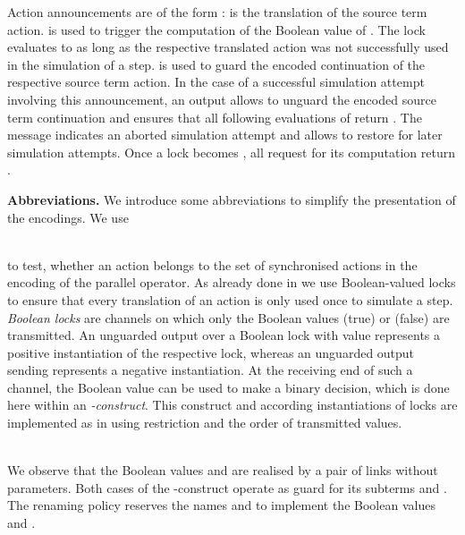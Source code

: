 \documentclass[copyright,creativecommons]{eptcs}
\begin{document}
Action announcements are of the form :  is the translation of the source term action.  is used to trigger the computation of the Boolean value of . The lock  evaluates to  as long as the respective translated action was not successfully used in the simulation of a step.  is used to guard the encoded continuation of the respective source term action. In the case of a successful simulation attempt involving this announcement, an output  allows to unguard the encoded source term continuation and ensures that all following evaluations of  return . The message  indicates an aborted simulation attempt and allows to restore  for later simulation attempts. Once a lock becomes , all request for its computation return .

\vspace{0.3em}
\noindent
\textbf{Abbreviations.}\;
We introduce some abbreviations to simplify the presentation of the encodings. We use
\vspace{-1.9em}

\vspace{-2em}\\
to test, whether an action belongs to the set of synchronised actions in the encoding of the parallel operator.
As already done in \cite{nestmann96, nestmannPierce00} we use Boolean-valued locks to ensure that every translation of an action is only used once to simulate a step.
\emph{Boolean locks} are channels on which only the Boolean values  (true) or  (false) are transmitted. 
An unguarded output over a Boolean lock with value  represents a positive instantiation of the respective lock, whereas an unguarded output sending  represents a negative instantiation. 
At the receiving end of such a channel, the Boolean value can be used to make a binary decision, which is done here within an \emph{-construct}.
This construct and according instantiations of locks are implemented as in \cite{nestmann96, nestmannPierce00} using restriction and the order of transmitted values.
\vspace{-0.5em}

\vspace{-2em}\\
We observe that the Boolean values  and  are realised by a pair of links without parameters. Both cases of the -construct operate as guard for its subterms  and . The renaming policy  reserves the names  and  to implement the Boolean values  and .
\end{document}
